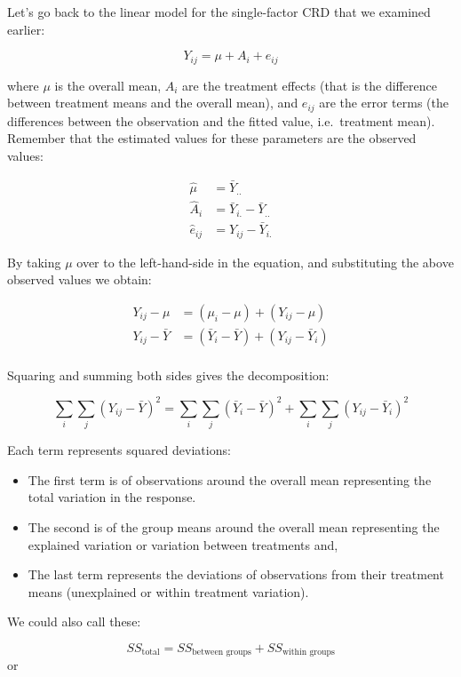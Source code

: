 \documentclass[
  letterpaper,
]{book}
\providecommand{\tightlist}{%
  \setlength{\itemsep}{0pt}\setlength{\parskip}{0pt}}\usepackage{longtable,booktabs,array}
\begin{document}
Let's go back to the linear model for the single-factor CRD that we
examined earlier:

\[
Y_{ij} = \mu + A_i + e_{ij}
\]

where \(\mu\) is the overall mean, \(A_i\) are the treatment effects
(that is the difference between treatment means and the overall mean),
and \(e_{ij}\) are the error terms (the differences between the
observation and the fitted value, i.e.~treatment mean). Remember that
the estimated values for these parameters are the observed values:

\[
\begin{aligned}
\hat{\mu} &= \bar{Y}_{..} \\
\hat{A}_i &= \bar{Y}_{i.} - \bar{Y}_{..}\\
\hat{e}_{ij} &= Y_{ij} -  \bar{Y}_{i.}
\end{aligned}
\]

By taking \(\mu\) over to the left-hand-side in the equation, and
substituting the above observed values we obtain:

\[
\begin{aligned}
Y_{ij} - \mu &= (\mu_i - \mu) + (Y_{ij} - \mu)\\
Y_{ij} - \bar{Y} &= (\bar{Y}_i - \bar{Y}) + (Y_{ij} - \bar{Y}_i) \\
\end{aligned}
\]

Squaring and summing both sides gives the decomposition:

\[
\sum_i \sum_j (Y_{ij} - \bar{Y})^2 = \sum_i \sum_j (\bar{Y}_i - \bar{Y})^2 + \sum_i \sum_j (Y_{ij} - \bar{Y}_i)^2
\]

Each term represents squared deviations:

\begin{itemize}
\tightlist
\item
  The first term is of observations around the overall mean representing
  the total variation in the response.
\item
  The second is of the group means around the overall mean representing
  the explained variation or variation between treatments and,
\item
  The last term represents the deviations of observations from their
  treatment means (unexplained or within treatment variation).
\end{itemize}

We could also call these:

\[
SS_{\text{total}} = SS_{\text{between groups}} + SS_{\text{within groups}}
\] or
\end{document}
